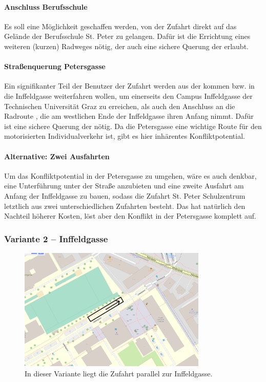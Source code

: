 \paragraph{Anschluss Berufsschule}
Es soll eine Möglichkeit geschaffen werden, von der Zufahrt direkt auf das Gelände der Berufsschule St. Peter zu gelangen. Dafür ist die Errichtung eines weiteren (kurzen) Radweges nötig, der auch eine sichere Querung der  erlaubt.

\paragraph{Straßenquerung Petersgasse}
Ein signifikanter Teil der Benutzer der Zufahrt werden aus der  kommen bzw. in die Inffeldgasse weiterfahren wollen, um einerseits den Campus Inffeldgasse der Technischen Universität Graz zu erreichen, als auch den Anschluss an die Radroute , die am westlichen Ende der Inffeldgasse ihren Anfang nimmt. Dafür ist eine sichere Querung der  nötig. Da die Petersgasse eine wichtige Route für den motorisierten Individualverkehr ist, gibt es hier inhärentes Konfliktpotential.

\paragraph{Alternative: Zwei Ausfahrten}
Um das Konfliktpotential in der Petersgasse zu umgehen, wäre es auch denkbar, eine Unterführung unter der Straße anzubieten und eine zweite Ausfahrt am Anfang der Inffeldgasse zu bauen, sodass die Zufahrt St. Peter Schulzentrum letztlich aus zwei unterschiedlichen Zufahrten besteht. Das hat natürlich den Nachteil höherer Kosten, löst aber den Konflikt in der Petersgasse komplett auf.

\subsubsection{Variante 2 -- Inffeldgasse}
\begin{figure}
    \centering
    \includegraphics[width=0.8\textwidth]{main/bike/tunnel/uni/zufahrt_inffeld_v2}
    \caption[Zufahrt Inffeldgasse]{In dieser Variante liegt die Zufahrt parallel zur Inffeldgasse.}
\end{figure}

